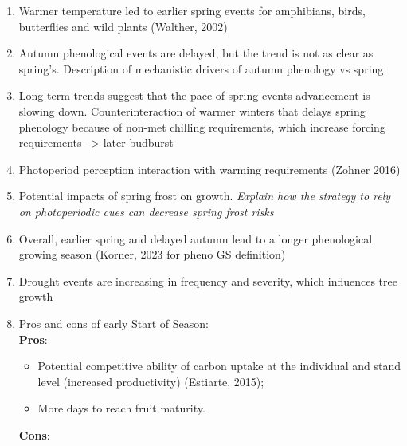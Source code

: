 \documentclass{article}
\begin{document}
\begin{enumerate}
	\item Warmer temperature led to earlier spring events for amphibians, birds, butterflies and wild plants (Walther, 2002)
	\item Autumn phenological events are delayed, but the trend is not as clear as spring's. Description of mechanistic drivers of autumn phenology vs spring
	\item Long-term trends suggest that the pace of spring events advancement is slowing down.  Counterinteraction of warmer winters that delays spring phenology because of non-met chilling requirements, which increase forcing requirements --> later budburst 
	\item Photoperiod perception interaction with warming requirements (Zohner 2016)
	\item Potential impacts of spring frost on growth. \textit{Explain how the strategy to rely on photoperiodic cues can decrease spring frost risks}
	\item Overall, earlier spring and delayed autumn lead to a longer phenological growing season (Korner, 2023 for pheno GS definition)
	\item Drought events are increasing in frequency and severity, which influences tree growth
	\item Pros and cons of early Start of Season: \\  %
		\textbf{Pros}: 
			\begin {itemize}
				\item Potential competitive ability of carbon uptake at the individual and stand level (increased productivity) (Estiarte, 2015); 
				\item More days to reach fruit maturity. 
			\end {itemize}
		\textbf{Cons}: 
			\begin {itemize}

\end{itemize}
\end{enumerate}
\end{document}
